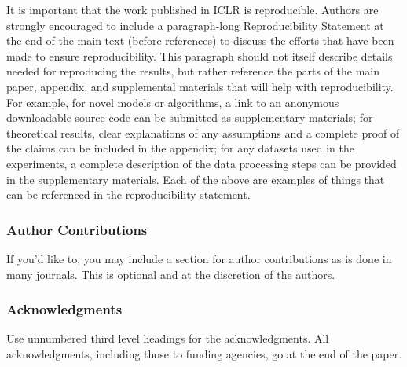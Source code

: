 \documentclass{article} %
\begin{document}
It is important that the work published in ICLR is reproducible. Authors are
strongly encouraged to include a paragraph-long Reproducibility Statement at the
end of the main text (before references) to discuss the efforts that have been
made to ensure reproducibility. This paragraph should not itself describe
details needed for reproducing the results, but rather reference the parts of
the main paper, appendix, and supplemental materials that will help with
reproducibility. For example, for novel models or algorithms, a link to an
anonymous downloadable source code can be submitted as supplementary materials;
for theoretical results, clear explanations of any assumptions and a complete
proof of the claims can be included in the appendix; for any datasets used in
the experiments, a complete description of the data processing steps can be
provided in the supplementary materials. Each of the above are examples of
things that can be referenced in the reproducibility statement.

\subsubsection*{Author Contributions}
If you'd like to, you may include  a section for author contributions as is done
in many journals. This is optional and at the discretion of the authors.

\subsubsection*{Acknowledgments}
Use unnumbered third level headings for the acknowledgments. All
acknowledgments, including those to funding agencies, go at the end of the paper.





\appendix
\end{document}
